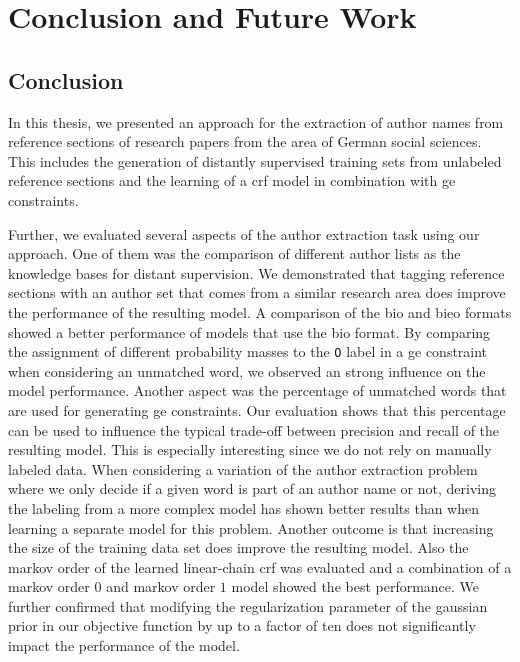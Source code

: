\chapter{Conclusion and Future Work}\label{cha:conclusion-and-future-work}

\section{Conclusion}\label{sec:conclusion}

In this thesis, we presented an approach for the extraction of author names from reference sections of research papers from the area of German social sciences.
This includes the generation of distantly supervised training sets from unlabeled reference sections and the learning of a \gls{crf} model in combination with \gls{ge} constraints.

Further, we evaluated several aspects of the author extraction task using our approach.
One of them was the comparison of different author lists as the knowledge bases for distant supervision.
We demonstrated that tagging reference sections with an author set that comes from a similar research area does improve the performance of the resulting model.
A comparison of the \gls{bio} and \gls{bieo} formats showed a better performance of models that use the \gls{bio} format.
By comparing the assignment of different probability masses to the \texttt{O} label in a \gls{ge constraint} when considering an unmatched word, we observed an strong influence on the model performance.
Another aspect was the percentage of unmatched words that are used for generating \gls{ge} constraints.
Our evaluation shows that this percentage can be used to influence the typical trade-off between \gls{precision} and \gls{recall} of the resulting model.
This is especially interesting since we do not rely on manually labeled data.
When considering a variation of the author extraction problem where we only decide if a given word is part of an author name or not, deriving the labeling from a more complex model has shown better results than when learning a separate model for this problem.
Another outcome is that increasing the size of the training data set does improve the resulting model.
Also the \gls{markov order} of the learned \gls{linear-chain crf} was evaluated and a combination of a \gls{markov order} $0$ and \gls{markov order} $1$ model showed the best performance.
We further confirmed that modifying the \gls{regularization parameter} of the \gls{gaussian prior} in our objective function by up to a factor of ten does not significantly impact the performance of the model.

